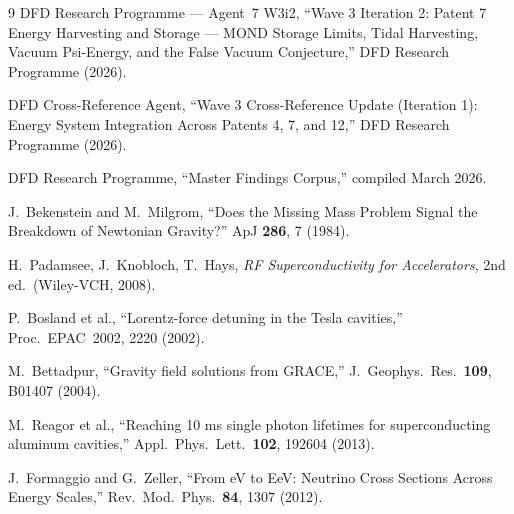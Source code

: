 \documentclass[aps,prd,twocolumn,superscriptaddress]{revtex4-2}
\begin{document}
\begin{thebibliography}{9}
 DFD Research Programme --- Agent~7 W3i2,
``Wave 3 Iteration 2: Patent 7 Energy Harvesting and Storage ---
MOND Storage Limits, Tidal Harvesting, Vacuum Psi-Energy, and the
False Vacuum Conjecture,'' DFD Research Programme (2026).

 DFD Cross-Reference Agent,
``Wave 3 Cross-Reference Update (Iteration 1): Energy System Integration
Across Patents 4, 7, and 12,'' DFD Research Programme (2026).

 DFD Research Programme,
``Master Findings Corpus,'' compiled March 2026.

 J.~Bekenstein and M.~Milgrom,
``Does the Missing Mass Problem Signal the Breakdown of Newtonian Gravity?''
ApJ \textbf{286}, 7 (1984).

 H.~Padamsee, J.~Knobloch, T.~Hays,
\textit{RF Superconductivity for Accelerators}, 2nd ed.\ (Wiley-VCH, 2008).

 P.~Bosland et al.,
``Lorentz-force detuning in the Tesla cavities,''
Proc.~EPAC~2002, 2220 (2002).

 M.~Bettadpur,
``Gravity field solutions from GRACE,''
J.~Geophys.\ Res.\ \textbf{109}, B01407 (2004).

 M.~Reagor et al.,
``Reaching 10 ms single photon lifetimes for superconducting aluminum
cavities,'' Appl.\ Phys.\ Lett.\ \textbf{102}, 192604 (2013).

 J.~Formaggio and G.~Zeller,
``From eV to EeV: Neutrino Cross Sections Across Energy Scales,''
Rev.\ Mod.\ Phys.\ \textbf{84}, 1307 (2012).
\end{thebibliography}
\end{document}
